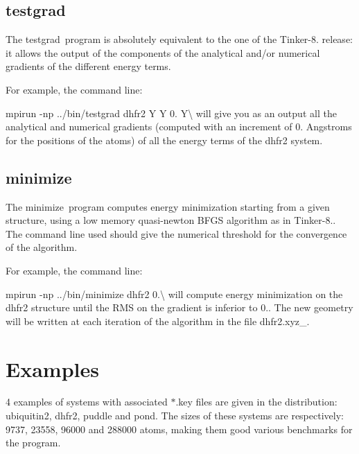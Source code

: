 \subsection*{{\ttfamily testgrad} }

The {\ttfamily testgrad} program is absolutely equivalent to the one of the Tinker-\/8. release\-: it allows the output of the components of the analytical and/or numerical gradients of the different energy terms.

For example, the command line\-:


\begin{DoxyItemize}
\item {\ttfamily mpirun -\/np}{ ../bin/testgrad dhfr2 Y Y 0. Y}\textbackslash{} will give you as an output all the analytical and numerical gradients (computed with an increment of 0. Angstroms for the positions of the atoms) of all the energy terms of the dhfr2 system.
\end{DoxyItemize}

\subsection*{{\ttfamily minimize}}

The {\ttfamily minimize} program computes energy minimization starting from a given structure, using a low memory quasi-\/newton B\-F\-G\-S algorithm as in Tinker-\/8.. The command line used should give the numerical threshold for the convergence of the algorithm.

For example, the command line\-:


\begin{DoxyItemize}
\item {\ttfamily mpirun -\/np}{ ../bin/minimize dhfr2 0.}\textbackslash{} will compute energy minimization on the dhfr2 structure until the R\-M\-S on the gradient is inferior to 0.. The new geometry will be written at each iteration of the algorithm in the file dhfr2.\-xyz\-\_.
\end{DoxyItemize}

\section*{Examples}

4 examples of systems with associated $\ast$.key files are given in the distribution\-: ubiquitin2, dhfr2, puddle and pond. The sizes of these systems are respectively\-: 9737, 23558, 96000 and 288000 atoms, making them good various benchmarks for the program.

